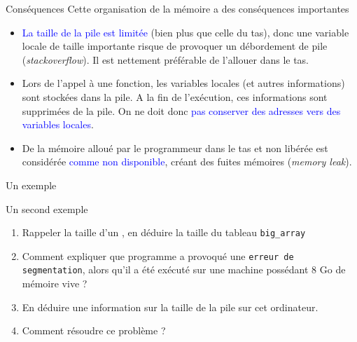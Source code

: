\documentclass[10pt]{beamer}
\begin{document}
\begin{frame}{\Ctitle}{\stitle}
	\begin{block}{Conséquences}
		Cette organisation de la mémoire a des conséquences importantes
		\begin{itemize}
			\item<1-> \textcolor{blue}{La taille de la pile est limitée} (bien plus que celle du tas), donc une variable locale de taille importante risque de provoquer un débordement de pile (\textit{stackoverflow}). Il est nettement préférable de l'allouer dans le tas.
			\item<2-> Lors de l'appel à une fonction, les variables locales (et autres informations) sont stockées dans la pile. A la fin de l'exécution, ces informations sont supprimées de la pile. On ne doit donc \textcolor{blue}{pas conserver des adresses vers des variables locales}.
			\item<3-> De la mémoire alloué par le programmeur dans le tas et non libérée est considérée \textcolor{blue}{comme non disponible}, créant des fuites mémoires (\textit{memory leak}).
		\end{itemize}
	\end{block}
\end{frame}


\begin{frame}[fragile]{\Ctitle}{\stitle}
	\begin{exampleblock}{Un  exemple}
	\end{exampleblock}
\end{frame}

\begin{frame}[fragile]{\Ctitle}{\stitle}
	\begin{exampleblock}{Un second exemple}
		{\small
		\begin{enumerate}
			\item<1-> Rappeler la taille d'un , en déduire la taille du tableau {\tt big\_array}
			\item<2-> Comment expliquer que programme a provoqué une {\tt erreur de segmentation}, alors qu'il a été exécuté sur une machine possédant 8 Go de mémoire vive ?
			\item<3-> En déduire une information sur la taille de la pile sur cet ordinateur. 
			\item<4-> Comment résoudre ce problème ? 
		\end{enumerate}}
	\end{exampleblock}
\end{frame}
\end{document}
